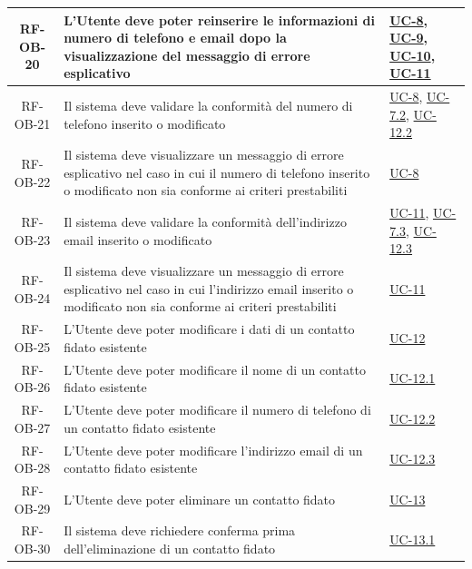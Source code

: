 \documentclass[a4paper,12pt]{article}
\begin{document}
\begin{center}
\begin{longtable}{|c|p{8.5cm}|>{\centering\arraybackslash}p{4cm}|}
RF-OB-20 & L'Utente deve poter reinserire le informazioni di numero di telefono e email dopo la visualizzazione del messaggio di errore esplicativo & \hyperref[subsec:UC-8]{UC-8}, \hyperref[subsec:UC-9]{UC-9}, \hyperref[subsec:UC-10]{UC-10}, \hyperref[subsec:UC-11]{UC-11} \\
\hline

RF-OB-21 & Il sistema deve validare la conformità del numero di telefono inserito o modificato & \hyperref[subsec:UC-8]{UC-8}, \hyperref[subsec:UC-7.2]{UC-7.2}, \hyperref[subsec:UC-12.2]{UC-12.2} \\
\hline

RF-OB-22 & Il sistema deve visualizzare un messaggio di errore esplicativo nel caso in cui il numero di telefono inserito o modificato non sia conforme ai criteri prestabiliti & \hyperref[subsec:UC-8]{UC-8} \\
\hline

RF-OB-23 & Il sistema deve validare la conformità dell'indirizzo email inserito o modificato & \hyperref[subsec:UC-11]{UC-11}, \hyperref[subsec:UC-7.3]{UC-7.3}, \hyperref[subsec:UC-12.3]{UC-12.3} \\
\hline

RF-OB-24 & Il sistema deve visualizzare un messaggio di errore esplicativo nel caso in cui l'indirizzo email inserito o modificato non sia conforme ai criteri prestabiliti & \hyperref[subsec:UC-11]{UC-11} \\
\hline

RF-OB-25 & L'Utente deve poter modificare i dati di un contatto fidato esistente & \hyperref[subsec:UC-12]{UC-12} \\
\hline

RF-OB-26 & L'Utente deve poter modificare il nome di un contatto fidato esistente & \hyperref[subsec:UC-12.1]{UC-12.1} \\
\hline

RF-OB-27 & L'Utente deve poter modificare il numero di telefono di un contatto fidato esistente & \hyperref[subsec:UC-12.2]{UC-12.2} \\
\hline

RF-OB-28 & L'Utente deve poter modificare l'indirizzo email di un contatto fidato esistente & \hyperref[subsec:UC-12.3]{UC-12.3} \\
\hline

RF-OB-29 & L'Utente deve poter eliminare un contatto fidato & \hyperref[subsec:UC-13]{UC-13} \\
\hline

RF-OB-30 & Il sistema deve richiedere conferma prima dell'eliminazione di un contatto fidato & \hyperref[subsec:UC-13.1]{UC-13.1} \\
\hline


\end{longtable}
\end{center}
\end{document}
